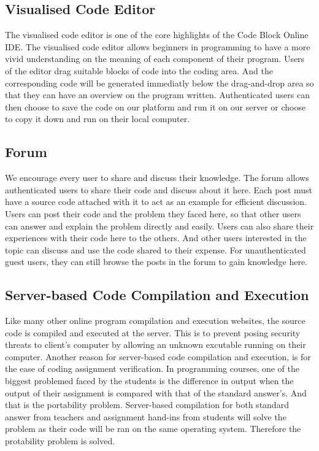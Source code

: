 \subsection{Visualised Code Editor}
The visualised code editor is one of the core highlights of the Code Block Online IDE. The visualised code editor allows beginners in programming to have a more vivid understanding on the meaning of each component of their program. Users of the editor drag suitable blocks of code into the coding area. And the corresponding code will be generated immediatly below the drag-and-drop area so that they can have an overview on the program written. Authenticated users can then choose to save the code on our platform and run it on our server or choose to copy it down and run on their local computer.

\subsection{Forum}
We encourage every user to share and discuss their knowledge. The forum allows authenticated users to share their code and discuss about it here. Each post must have a source code attached with it to act as an example for efficient discussion. Users can post their code and the problem they faced here, so that other users can answer and explain the problem directly and easily. Users can also share their experiences with their code here to the others. And other users interested in the topic can discuss and use the code shared to their expense. For unauthenticated guest users, they can still browse the posts in the forum to gain knowledge here.

\subsection{Server-based Code Compilation and Execution}
Like many other online program compilation and execution websites, the source code is compiled and executed at the server. This is to prevent posing security threats to client's computer by allowing an unknown excutable running on their computer. Another reason for server-based code compilation and execution, is for the ease of coding assignment verification. In programming courses, one of the biggest problemed faced by the students is the difference in output when the output of their assignment is compared with that of the standard answer's. And that is the portability problem. Server-based compilation for both standard answer from teachers and assignment hand-ins from students will solve the problem as their code will be ran on the same operating system. Therefore the protability problem is solved.

